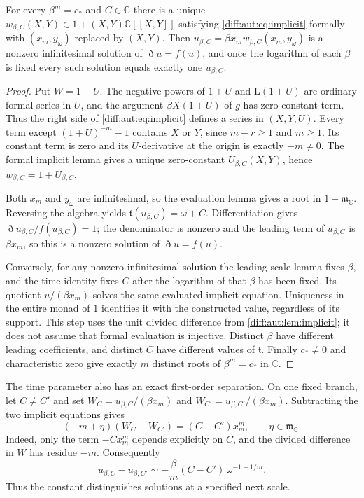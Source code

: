 \documentclass[11pt,letterpaper]{article}
\numberwithin{equation}{section}
\theoremstyle{definition}
\theoremstyle{remark}
\newcommand{\C}{\mathbb C}
\newcommand{\mm}{\mathfrak m}
\newcommand{\Lmm}{\mathrm{L}}
\newcommand{\Dn}{\eth}
\begin{document}
\begin{proposition}
\label{diff:aut:prop:multiple}
For every $\beta^{m}=c_{\ast}$ and $C\in\C$ there is a unique
$w_{\beta,C}(X,Y)\in1+(X,Y)\C[[X,Y]]$ satisfying \cref{diff:aut:eq:implicit}
formally with $(x_{m},y_{\omega})$ replaced by $(X,Y)$. Then
$u_{\beta,C}=\beta x_{m}w_{\beta,C}(x_{m},y_{\omega})$ is a nonzero infinitesimal
solution of $\Dn u=f(u)$, and once the logarithm of each $\beta$ is fixed every
such solution equals exactly one $u_{\beta,C}$.
\end{proposition}
\begin{proof}
Put $W=1+U$. The negative powers of $1+U$ and
$\Lmm(1+U)$ are ordinary formal series in $U$, and the argument
$\beta X(1+U)$ of $g$ has zero constant term. Thus the right side
of \cref{diff:aut:eq:implicit} defines a series in $(X,Y,U)$.
Every term except $(1+U)^{-m}-1$ contains $X$ or $Y$, since
$m-r\geq1$ and $m\geq1$. Its constant term is zero and its
$U$-derivative at the origin is exactly $-m\neq0$.
The formal implicit lemma gives a unique zero-constant
$U_{\beta,C}(X,Y)$, hence $w_{\beta,C}=1+U_{\beta,C}$.

Both $x_m$ and $y_\omega$ are infinitesimal, so the evaluation
lemma gives a root in $1+\mm_\C$. Reversing the algebra yields
$\mathfrak t(u_{\beta,C})=\omega+C$. Differentiation gives
$\Dn u_{\beta,C}/f(u_{\beta,C})=1$; the denominator is nonzero
and the leading term of $u_{\beta,C}$ is $\beta x_m$, so this is
a nonzero solution of $\Dn u=f(u)$.

Conversely, for any nonzero infinitesimal solution the leading-scale
lemma fixes $\beta$, and the time identity fixes $C$ after the
logarithm of that $\beta$ has been fixed. Its quotient
$u/(\beta x_m)$ solves the same evaluated implicit equation.
Uniqueness in the entire monad of $1$ identifies it with the
constructed value, regardless of its support. This step uses the
unit divided difference from \cref{diff:aut:lem:implicit}; it does
not assume that formal evaluation is injective. Distinct $\beta$
have different leading coefficients, and distinct $C$ have different
values of $\mathfrak t$. Finally $c_*\neq0$ and characteristic zero
give exactly $m$ distinct roots of $\beta^m=c_*$ in $\C$.
\end{proof}

The time parameter also has an exact first-order separation. On one
fixed branch, let $C\neq C'$ and set
$W_C=u_{\beta,C}/(\beta x_m)$ and
$W_{C'}=u_{\beta,C'}/(\beta x_m)$. Subtracting the two implicit
equations gives
\[
 (-m+\eta)(W_C-W_{C'})=(C-C')x_m^m,
 \qquad \eta\in\mm_\C.
\]
Indeed, only the term $-Cx_m^m$ depends explicitly on $C$, and the
divided difference in $W$ has residue $-m$. Consequently
\[
 u_{\beta,C}-u_{\beta,C'}
 \sim-\frac{\beta}{m}(C-C')\,\omega^{-1-1/m}.
\]
Thus the constant distinguishes solutions at a specified next scale.
\end{document}
